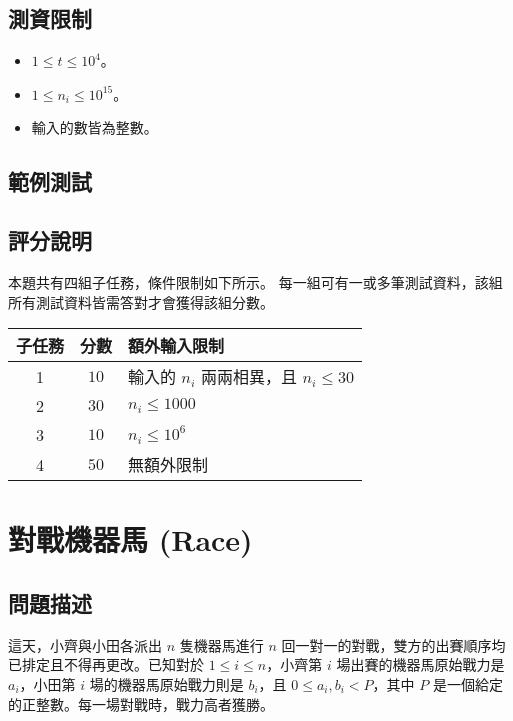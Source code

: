 \subsection{測資限制}

\begin{itemize}
\tightlist
\item
  \(1 \le t \le 10^4\)。
\item
  \(1 \le n_i \le 10^{15}\)。
\item
  輸入的數皆為整數。
\end{itemize}

\subsection{範例測試}

\begin{example}
%
\end{example}

\subsection{評分說明}

本題共有四組子任務，條件限制如下所示。
每一組可有一或多筆測試資料，該組所有測試資料皆需答對才會獲得該組分數。

\begin{longtable}[]{@{}ccl@{}}
\toprule
子任務 & 分數 & 額外輸入限制 \\
\midrule
\endhead
1 & \(10\) & 輸入的 \(n_i\) 兩兩相異，且 \(n_i \le 30\) \\
2 & \(30\) & \(n_i \le 1000\) \\
3 & \(10\) & \(n_i \le 10^6\) \\
4 & \(50\) & 無額外限制 \\
\bottomrule
\end{longtable}

\section{對戰機器馬 (Race)}

\subsection{問題描述}

這天，小齊與小田各派出 \(n\) 隻機器馬進行 \(n\)
回一對一的對戰，雙方的出賽順序均已排定且不得再更改。已知對於
\(1\le i \le n\)，小齊第 \(i\) 場出賽的機器馬原始戰力是 \(a_i\)，小田第
\(i\) 場的機器馬原始戰力則是 \(b_i\)，且 \(0\le a_i, b_i< P\)，其中
\(P\) 是一個給定的正整數。每一場對戰時，戰力高者獲勝。

